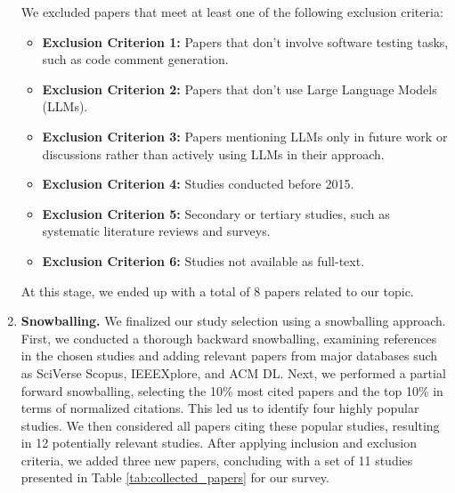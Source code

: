 \begin{enumerate}[label=\textbf{\arabic*.}]
\begin{itemize}
      \end{itemize}

  We excluded papers that meet at least one of the following exclusion criteria:
        \begin{itemize}
            \item \textbf{Exclusion Criterion 1:} Papers that don't involve software testing tasks, such as code comment generation.
            \item \textbf{Exclusion Criterion 2:} Papers that don't use Large Language Models (LLMs).
            \item \textbf{Exclusion Criterion 3:} Papers mentioning LLMs only in future work or discussions rather than actively using LLMs in their approach.
            \item \textbf{Exclusion Criterion 4:} Studies conducted before 2015.
            \item \textbf{Exclusion Criterion 5:} Secondary or tertiary studies, such as systematic literature reviews and surveys.
            \item \textbf{Exclusion Criterion 6:} Studies not available as full-text.
      \end{itemize}
At this stage, we ended up with a total of 8 papers related to our topic.

  \item\textbf{Snowballing.} We finalized our study selection using a snowballing approach. First, we conducted a thorough backward snowballing, examining references in the chosen studies and adding relevant papers from major databases such as SciVerse Scopus, IEEEXplore, and ACM DL. Next, we performed a partial forward snowballing, selecting the 10\% most cited papers and the top 10\% in terms of normalized citations. This led us to identify four highly popular studies. We then considered all papers citing these popular studies, resulting in 12 potentially relevant studies. After applying inclusion and exclusion criteria, we added three new papers, concluding with a set of 11 studies presented in Table \ref{tab:collected_papers} for our survey.
\end{enumerate}

